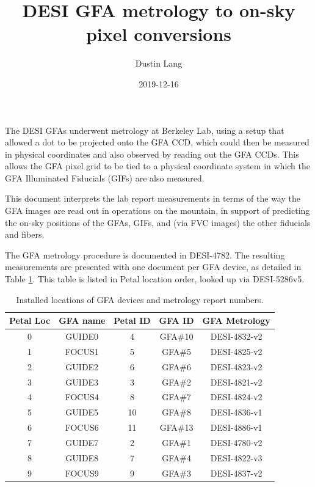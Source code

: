 \documentclass[10pt]{article}
\title{DESI GFA metrology to on-sky pixel conversions}
\author{Dustin Lang}
\date{2019-12-16}
\begin{document}
\maketitle

The DESI GFAs underwent metrology at Berkeley Lab, using a setup that
allowed a dot to be projected onto the GFA CCD, which could then be
measured in physical coordinates and also observed by reading out the
GFA CCDs.  This allows the GFA pixel grid to be tied to a physical
coordinate system in which the GFA Illuminated Fiducials (GIFs) are
also measured.

This document interprets the lab report measurements in terms of the
way the GFA images are read out in operations on the mountain, in
support of predicting the on-sky positions of the GFAs, GIFs, and (via
FVC images) the other fiducials and fibers.

The GFA metrology procedure is documented in DESI-4782.  The resulting
measurements are presented with one document per GFA device, as
detailed in Table \ref{tab:gfareports}.  This table is listed in Petal
location order, looked up via DESI-5286v5.

\begin{table}[h!]
  \begin{center}
    \begin{tabular}{|c|c|c|c|c|}
      \hline
      Petal Loc & GFA name & Petal ID & GFA ID & GFA Metrology \\ %
      \hline
      0 & GUIDE0 & 4  & GFA\#10 & DESI-4832-v2 \\ %
      1 & FOCUS1 & 5  & GFA\#5 & DESI-4825-v2 \\
      2 & GUIDE2 & 6  & GFA\#6 & DESI-4823-v2 \\
      3 & GUIDE3 & 3  & GFA\#2 & DESI-4821-v2 \\
      4 & FOCUS4 & 8  & GFA\#7 & DESI-4824-v2 \\
      5 & GUIDE5 & 10 & GFA\#8 & DESI-4836-v1 \\
      6 & FOCUS6 & 11 & GFA\#13 & DESI-4886-v1 \\
      7 & GUIDE7 & 2  & GFA\#1 & DESI-4780-v2 \\
      8 & GUIDE8 & 7  & GFA\#4 & DESI-4822-v3 \\
      9 & FOCUS9 & 9  & GFA\#3 & DESI-4837-v2 \\
      \hline
    \end{tabular}
    \caption{\label{tab:gfareports}Installed locations of GFA devices and
      metrology report numbers.}
  \end{center}
\end{table}
\end{document}
